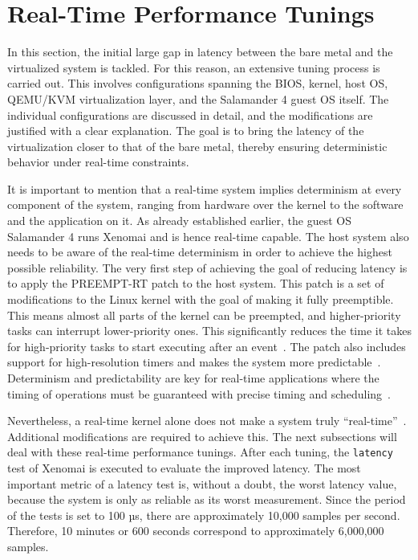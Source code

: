 \documentclass[MMR,Master,english]{style/twbook}
\begin{document}
\clearpage

\section{Real-Time Performance Tunings}\label{sec:real-time_tunings}

In this section, the initial large gap in latency between the bare metal and the virtualized system is tackled. For this reason, an extensive tuning process is carried out. This involves configurations spanning the BIOS, kernel, host OS, QEMU/KVM virtualization layer, and the Salamander 4 guest OS itself. The individual configurations are discussed in detail, and the modifications are justified with a clear explanation. The goal is to bring the latency of the virtualization closer to that of the bare metal, thereby ensuring deterministic behavior under real-time constraints.

\bigskip \noindent It is important to mention that a real-time system implies determinism at every component of the system, ranging from hardware over the kernel to the software and the application on it. As already established earlier, the guest OS Salamander 4 runs Xenomai and is hence real-time capable. The host system also needs to be aware of the real-time determinism in order to achieve the highest possible reliability. The very first step of achieving the goal of reducing latency is to apply the PREEMPT-RT patch to the host system. This patch is a set of modifications to the Linux kernel with the goal of making it fully preemptible. This means almost all parts of the kernel can be preempted, and higher-priority tasks can interrupt lower-priority ones. This significantly reduces the time it takes for high-priority tasks to start executing after an event~\cite{RealtimeKernelPatchset}. The patch also includes support for high-resolution timers and makes the system more predictable~\cite{lutsykPipelinedMulticoreMachine2020}. Determinism and predictability are key for real-time applications where the timing of operations must be guaranteed with precise timing and scheduling~\cite{rostedtInternalsRTPatch2007}.

\bigskip \noindent Nevertheless, a real-time kernel alone does not make a system truly “real-time”~\cite{WhatRealtimeLinuxa}. Additional modifications are required to achieve this. The next subsections will deal with these real-time performance tunings. After each tuning, the \texttt{latency} test of Xenomai is executed to evaluate the improved latency. The most important metric of a latency test is, without a doubt, the worst latency value, because the system is only as reliable as its worst measurement. Since the period of the tests is set to 100 µs, there are approximately 10,000 samples per second. Therefore, 10 minutes or 600 seconds correspond to approximately 6,000,000 samples.
\end{document}
